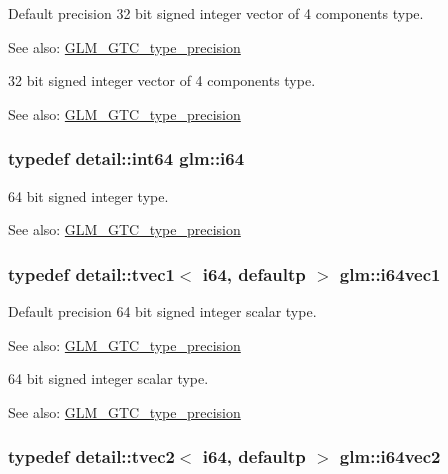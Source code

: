Default precision 32 bit signed integer vector of 4 components type. \begin{Desc}
\item[See also:]\hyperlink{group__gtc__type__precision}{GLM\_\-GTC\_\-type\_\-precision}\end{Desc}
32 bit signed integer vector of 4 components type. \begin{Desc}
\item[See also:]\hyperlink{group__gtc__type__precision}{GLM\_\-GTC\_\-type\_\-precision} \end{Desc}
\hypertarget{group__gtc__type__precision_gc7a7eaad46064fc952b06df33689da23}{
\subsubsection[i64]{\setlength{\rightskip}{0pt plus 5cm}typedef detail::int64 {\bf glm::i64}}}
\label{group__gtc__type__precision_gc7a7eaad46064fc952b06df33689da23}


64 bit signed integer type. \begin{Desc}
\item[See also:]\hyperlink{group__gtc__type__precision}{GLM\_\-GTC\_\-type\_\-precision} \end{Desc}
\hypertarget{group__gtc__type__precision_g8bc234da7e4a6436e01241f439fc7ddd}{
\subsubsection[i64vec1]{\setlength{\rightskip}{0pt plus 5cm}typedef detail::tvec1$<$ i64, defaultp $>$ {\bf glm::i64vec1}}}
\label{group__gtc__type__precision_g8bc234da7e4a6436e01241f439fc7ddd}


Default precision 64 bit signed integer scalar type. \begin{Desc}
\item[See also:]\hyperlink{group__gtc__type__precision}{GLM\_\-GTC\_\-type\_\-precision}\end{Desc}
64 bit signed integer scalar type. \begin{Desc}
\item[See also:]\hyperlink{group__gtc__type__precision}{GLM\_\-GTC\_\-type\_\-precision} \end{Desc}
\hypertarget{group__gtc__type__precision_g75461c98baf3e3913566550bd9d8d17f}{
\subsubsection[i64vec2]{\setlength{\rightskip}{0pt plus 5cm}typedef detail::tvec2$<$ i64, defaultp $>$ {\bf glm::i64vec2}}}
\label{group__gtc__type__precision_g75461c98baf3e3913566550bd9d8d17f}


